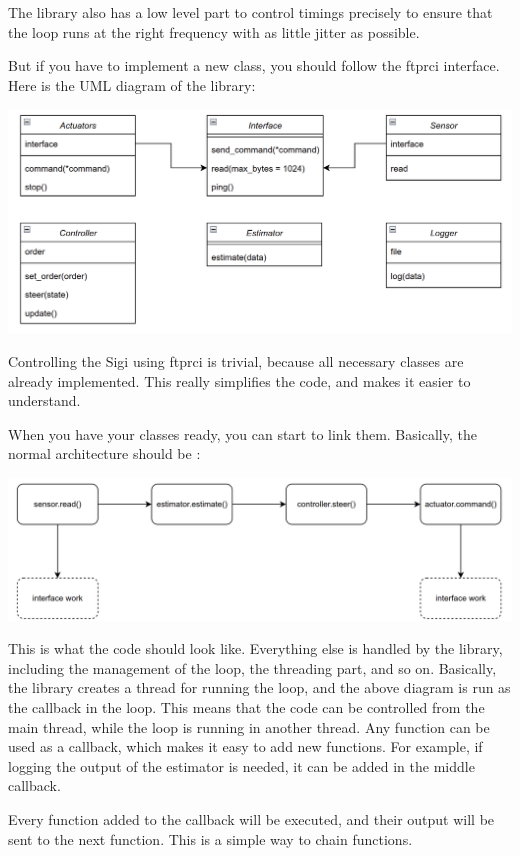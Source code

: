\documentclass{article}
\begin{document}
The library also has a low level part to control timings precisely to ensure that the loop runs at
the right frequency with as little jitter as possible.

But if you have to implement a new class, you should follow the ftprci interface.
Here is the UML diagram of the library:

\includegraphics[scale=0.2]{img/uml_ftprci.png}

Controlling the Sigi using ftprci is trivial, because all necessary classes are already
implemented. This really simplifies the code, and makes it easier to understand.

When you have your classes ready, you can start to link them. Basically, the normal architecture
should be :

\includegraphics[scale=0.2]{img/gen_flowchart_ftprci.png}

This is what the code should look like. Everything else is handled by the library, including
the management of the loop, the threading part, and so on.
Basically, the library creates a thread for running the loop, and the above diagram is run as
the callback in the loop.
This means that the code can be controlled from the main thread, while
the loop is running in another thread.
Any function can be used as a callback, which makes it easy to add new functions. For example, if
logging the output of the estimator is needed, it can be added in the middle callback.

Every function added to the callback will be executed, and their output will be sent to the next
function. This is a simple way to chain functions.
\end{document}
